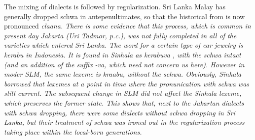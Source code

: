 The mixing of dialects is followed by regularization. Sri Lanka Malay has generally dropped schwa in antepenultimates, so that the historical from  is now pronounced \em claana\em. There is some evidence that this process, which is common in present day Jakarta (Uri Tadmor, p.c.), was not fully completed in all of the varieties which entered Sri Lanka. The word for a certain type of ear jewelry is \em kerabu \em in Indonesia. It is found in Sinhala as \em kerabuva \em \citep{Gunasekara1891}, with the schwa intact (and an addition of the suffix \em -va\em, which need not concern us here). However in moder SLM, the same lexeme is \em kraabu\em, without the schwa. Obviously, Sinhala borrowed that lexemes at a point in time where the pronunication with schwa was still current. The subsequent change in SLM did not affect the Sinhala lexeme, which preserves the former state. This shows that, next to the Jakartan dialects with schwa dropping, there were some dialects without schwa dropping in Sri Lanka, but their treatment of schwa was ironed out in the regularization process taking place within the local-born generations.
  
